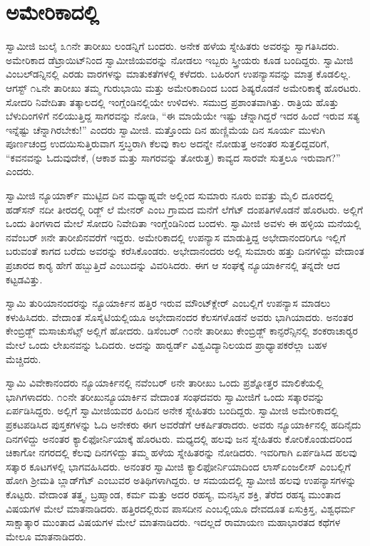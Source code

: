 
\chapter{ಅಮೇರಿಕಾದಲ್ಲಿ}

 ಸ್ವಾಮೀಜಿ ಜುಲೈ ೩೧ನೇ ತಾರೀಖು ಲಂಡನ್ನಿಗೆ ಬಂದರು. ಅನೇಕ ಹಳೆಯ ಸ್ನೇಹಿತರು ಅವರನ್ನು ಸ್ವಾಗತಿಸಿದರು. ಅಮೇರಿಕಾದ ಡೆಟ್ರಾಯಿಟ್‍ನಿಂದ ಸ್ವಾಮೀಜಿಯವರನ್ನು ನೋಡಲು ಇಬ್ಬರು ಸ್ತ್ರೀಯರು ಕೂಡ ಬಂದಿದ್ದರು. ಸ್ವಾಮೀಜಿ ವಿಂಬಲ್‍ಡನ್ನಿನಲ್ಲಿ ಎರಡು ವಾರಗಳನ್ನು ಮಾತುಕತೆಗಳಲ್ಲಿ ಕಳೆದರು. ಬಹಿರಂಗ ಉಪನ್ಯಾಸವನ್ನು ಮಾತ್ರ ಕೊಡಲಿಲ್ಲ. ಆಗಸ್ಟ್ ೧೬ನೇ ತಾರೀಖು ತಮ್ಮ ಗುರುಭಾಯಿ ಮತ್ತು ಅಮೇರಿಕಾದಿಂದ ಬಂದ ಶಿಷ್ಯರೊಡನೆ ಅಮೇರಿಕಾಕ್ಕೆ ಹೊರಟರು. ಸೋದರಿ ನಿವೇದಿತಾ ತತ್ಕಾಲದಲ್ಲಿ ಇಂಗ್ಲೆಂಡಿನಲ್ಲಿಯೇ ಉಳಿದಳು. ಸಮುದ್ರ ಪ್ರಶಾಂತವಾಗಿತ್ತು. ರಾತ್ರಿಯ ಹೊತ್ತು ಬೆಳುದಿಂಗಳಿಗೆ ನಲಿಯುತ್ತಿದ್ದ ಸಾಗರವನ್ನು ನೋಡಿ, “ಈ ಮಾಯೆಯೇ ಇಷ್ಟು ಚೆನ್ನಾಗಿದ್ದರೆ ಇದರ ಹಿಂದೆ ಇರುವ ಸತ್ಯ ಇನ್ನೆಷ್ಟು ಚೆನ್ನಾಗಿರಬೇಕು!” ಎಂದರು ಸ್ವಾಮೀಜಿ. ಮತ್ತೊಂದು ದಿನ ಹುಣ್ಣಿಮೆಯ ದಿನ ಸೂರ್ಯ ಮುಳುಗಿ ಪೂರ್ಣಚಂದ್ರ ಉದಯಿಸುತ್ತಿರುವಾಗ ಸ್ತಬ್ಧರಾಗಿ ಕೆಲವು ಕಾಲ ಅದನ್ನೇ ನೋಡುತ್ತ ಅನಂತರ ಸುತ್ತಲಿದ್ದವರಿಗೆ, “ಕವನವನ್ನು ಓದುವುದೇಕೆ, (ಆಕಾಶ ಮತ್ತು ಸಾಗರವನ್ನು ತೋರುತ್ತ) ಕಾವ್ಯದ ಸಾರವೇ ಸುತ್ತಲೂ ಇರುವಾಗ?” ಎಂದರು. 

 ಸ್ವಾಮೀಜಿ ನ್ಯೂಯಾರ್ಕ್ ಮುಟ್ಟಿದ ದಿನ ಮಧ್ಯಾಹ್ನವೇ ಅಲ್ಲಿಂದ ಸುಮಾರು ನೂರು ಐವತ್ತು ಮೈಲಿ ದೂರದಲ್ಲಿ ಹಡ್‍ಸನ್ ನದೀ ತೀರದಲ್ಲಿ ರಿಡ್ಜ್ ಲೆ ಮೇನರ್ ಎಂಬ ಗ್ರಾಮದ ಮನೆಗೆ ಲೆಗೆಟ್ ದಂಪತಿಗಳೊಡನೆ ಹೊರಟರು. ಅಲ್ಲಿಗೆ ಒಂದು ತಿಂಗಳಾದ ಮೇಲೆ ಸೋದರಿ ನಿವೇದಿತಾ ಇಂಗ್ಲೆಂಡಿನಿಂದ ಬಂದಳು. ಸ್ವಾಮೀಜಿ ಅವಳು ಈ ಹಳ್ಳಿಯ ಮನೆಯಲ್ಲಿ ನವೆಂಬರ್ ೫ನೇ ತಾರೀಖಿನವರೆಗೆ ಇದ್ದರು. ಅಮೇರಿಕಾದಲ್ಲಿ ಉಪನ್ಯಾಸ ಮಾಡುತ್ತಿದ್ದ ಅಭೇದಾನಂದರಿಗೂ ಇಲ್ಲಿಗೆ ಬರುವಂತೆ ಕಾಗದ ಬರೆದು ಅವರನ್ನು ಕರೆಸಿಕೊಂಡರು. ಅಭೇದಾನಂದರು ಅಲ್ಲಿ ಸುಮಾರು ಹತ್ತು ದಿನಗಳಿದ್ದು ವೇದಾಂತ ಪ್ರಚಾರದ ಕಾರ‍್ಯ ಹೇಗೆ ಹಬ್ಬುತ್ತಿದೆ ಎಂಬುದನ್ನು ವಿವರಿಸಿದರು. ಈಗ ಆ ಸಂಘಕ್ಕೆ ನ್ಯೂಯಾರ್ಕಿನಲ್ಲಿ ತನ್ನದೇ ಆದ ಕಟ್ಟಡವಿತ್ತು. 

 ಸ್ವಾಮಿ ತುರಿಯಾನಂದರನ್ನು ನ್ಯೂಯಾರ್ಕಿನ ಹತ್ತಿರ ಇರುವ ಮೌಂಟ್‍ಕ್ಲೇರ್ ಎಂಬಲ್ಲಿಗೆ ಉಪನ್ಯಾಸ ಮಾಡಲು ಕಳುಹಿಸಿದರು. ವೇದಾಂತ ಸೊಸೈಟಿಯಲ್ಲಿಯೂ ಅಭೇದಾನಂದರ ಕೆಲಸಗಳೊಡನೆ ಅವರು ಭಾಗಿಯಾದರು. ಅನಂತರ ಕೇಂಬ್ರಿಡ್ಜ್ ಮಸಾಚುಸೆಟ್ಸ್ ಅಲ್ಲಿಗೆ ಹೋದರು. ಡಿಸೆಂಬರ್ ೧೦ನೇ ತಾರೀಖು ಕೇಂಬ್ರಿಡ್ಜ್ ಕಾನ್ಫರೆನ್ಸಿನಲ್ಲಿ ಶಂಕರಾಚಾರ‍್ಯರ ಮೇಲೆ ಒಂದು ಲೇಖನವನ್ನು ಓದಿದರು. ಅದನ್ನು ಹಾರ್‍ವರ್ಡ್ ವಿಶ್ವವಿದ್ಯಾನಿಲಯದ ಪ್ರಾಧ್ಯಾಪಕರೆಲ್ಲಾ ಬಹಳ ಮೆಚ್ಚಿದರು. 

 ಸ್ವಾಮಿ ವಿವೇಕಾನಂದರು ನ್ಯೂಯಾರ್ಕಿನಲ್ಲಿ ನವೆಂಬರ್ ೮ನೇ ತಾರೀಖು ಒಂದು ಪ್ರಶ್ನೋತ್ತರ ಮಾಲಿಕೆಯಲ್ಲಿ ಭಾಗಿಗಳಾದರು. ೧೦ನೇ ತರೀಖು\break ನ್ಯೂಯಾರ್ಕಿನ ವೇದಾಂತ ಸಂಘದವರು ಸ್ವಾಮೀಜಿಗೆ ಒಂದು ಸತ್ಕಾರವನ್ನು ಏರ್ಪಡಿಸಿದ್ದರು. ಅಲ್ಲಿಗೆ ಸ್ವಾಮೀಜಿಯವರ ಹಿಂದಿನ ಅನೇಕ ಸ್ನೇಹಿತರು ಬಂದಿದ್ದರು. ಸ್ವಾಮೀಜಿ ಅಮೇರಿಕಾದಲ್ಲಿ ಪ್ರಕಟಪಡಿಸಿದ ಪುಸ್ತಕಗಳನ್ನು ಓದಿ ಅನೇಕರು ಈಗ ಅವರೆಡೆಗೆ ಆಕರ್ಷಿತರಾದರು. ಅವರು ನ್ಯೂಯಾರ್ಕಿನಲ್ಲಿ ಹದಿನೈದು ದಿನಗಳಿದ್ದು ಅನಂತರ ಕ್ಯಾಲಿಫೋರ್ನಿಯಾಕ್ಕೆ ಹೊರಟರು. ಮಧ್ಯದಲ್ಲಿ ಹಲವು ಜನ ಸ್ನೇಹಿತರು ಕೋರಿಕೊಂಡುದರಿಂದ ಚಿಕಾಗೋ ನಗರದಲ್ಲಿ ಕೆಲವು ದಿನಗಳಿದ್ದು ತಮ್ಮ ಹಳೆಯ ಸ್ನೇಹಿತರನ್ನು ನೋಡಿದರು. ಇವರಿಗಾಗಿ ಏರ್ಪಡಿಸಿದ ಹಲವು ಸತ್ಕಾರ ಕೂಟಗಳಲ್ಲಿ ಭಾಗವಹಿಸಿದರು. ಅನಂತರ ಸ್ವಾಮೀಜಿ ಕ್ಯಾಲಿಫೋರ್ನಿಯಾದಿಂದ ಲಾಸ್‍ಏಂಜಲೀಸ್ ಎಂಬಲ್ಲಿಗೆ ಹೋಗಿ ಶ‍್ರೀಮತಿ ಬ್ಲಾಡ್‍ಗೆಟ್ ಎಂಬುವರ ಅತಿಥಿಗಳಾಗಿದ್ದರು. ಆ ಸಮಯದಲ್ಲಿ ಸ್ವಾಮೀಜಿ ಹಲವು ಉಪನ್ಯಾಸಗಳನ್ನು ಕೊಟ್ಟರು. ವೇದಾಂತ ತತ್ತ್ವ, ಬ್ರಹ್ಮಾಂಡ, ಕರ್ಮ ಮತ್ತು ಅದರ ರಹಸ್ಯ, ಮನಸ್ಸಿನ ಶಕ್ತಿ, ತೆರೆದ ರಹಸ್ಯ ಮುಂತಾದ ವಿಷಯಗಳ ಮೇಲೆ ಮಾತನಾಡಿದರು. ಹತ್ತಿರದಲ್ಲಿರುವ ಪಾಸದೀನ ಎಂಬಲ್ಲಿಯೂ ದೇವದೂತ ಏಸುಕ್ರಿಸ್ತ, ವಿಶ್ವಧರ್ಮ ಸಾಕ್ಷಾತ್ಕಾರ ಮುಂತಾದ ವಿಷಯಗಳ ಮೇಲೆ ಮಾತನಾಡಿದರು. ಇದಲ್ಲದೆ ರಾಮಾಯಣ ಮಹಾಭಾರತದ ಕಥೆಗಳ ಮೇಲೂ ಮಾತನಾಡಿದರು. 


